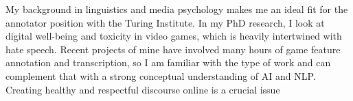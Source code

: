 

\begin{cvparagraph}

My background in linguistics and media psychology makes me an ideal fit for the annotator position with the Turing Institute. In my PhD research, I look at digital well-being and toxicity in video games, which is heavily intertwined with hate speech. Recent projects of mine have involved many hours of game feature annotation and transcription, so I am familiar with the type of work and can complement that with a strong conceptual understanding of AI and NLP. Creating healthy and respectful discourse online is a crucial issue 
\end{cvparagraph}